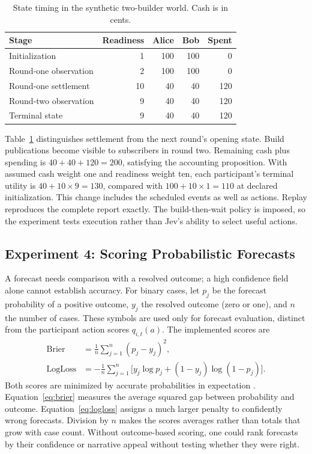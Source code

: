 \begin{table}[t]
\caption{State timing in the synthetic two-builder world. Cash is in cents.}
\label{tab:timing}
\centering\footnotesize
\begin{tabular}{@{}lrrrr@{}}
\toprule Stage & Readiness & Alice & Bob & Spent \\
\midrule
Initialization & 1 & 100 & 100 & 0 \\
Round-one observation & 2 & 100 & 100 & 0 \\
Round-one settlement & 10 & 40 & 40 & 120 \\
Round-two observation & 9 & 40 & 40 & 120 \\
Terminal state & 9 & 40 & 40 & 120 \\
\bottomrule
\end{tabular}
\end{table}

Table~\ref{tab:timing} distinguishes settlement from the next round's opening
state. Build publications become visible to subscribers in round two.
Remaining cash plus spending is $40+40+120=200$, satisfying the accounting
proposition. With assumed cash weight one and readiness weight ten, each
participant's terminal utility is $40+10\times9=130$, compared with
$100+10\times1=110$ at declared initialization. This change includes the
scheduled events as well as actions. Replay reproduces the complete report
exactly. The build-then-wait policy is imposed, so the experiment tests
execution rather than Jev's ability to select useful actions.

\subsection{Experiment 4: Scoring Probabilistic Forecasts}
A forecast needs comparison with a resolved outcome; a high confidence field
alone cannot establish accuracy. For binary cases, let $p_j$ be the forecast
probability of a positive outcome, $y_j$ the resolved outcome (zero or one),
and $n$ the number of cases. These symbols are used only for forecast
evaluation, distinct from the participant action scores $q_{i,t}(a)$.
The implemented scores are
\begin{align}
\operatorname{Brier}&=\frac{1}{n}\sum_{j=1}^{n}(p_j-y_j)^2,
\label{eq:brier}\\
\operatorname{LogLoss}&=-\frac{1}{n}\sum_{j=1}^{n}
\big[y_j\log p_j+(1-y_j)\log(1-p_j)\big].
\label{eq:logloss}
\end{align}
Both scores are minimized by accurate probabilities in expectation
\cite{brier1950,gneiting2007}. Equation~\eqref{eq:brier} measures the average
squared gap between probability and outcome. Equation~\eqref{eq:logloss}
assigns a much larger penalty to confidently wrong forecasts. Division by
$n$ makes the scores averages rather than totals that grow with case count.
Without outcome-based scoring, one could rank forecasts by their confidence
or narrative appeal without testing whether they were right.

